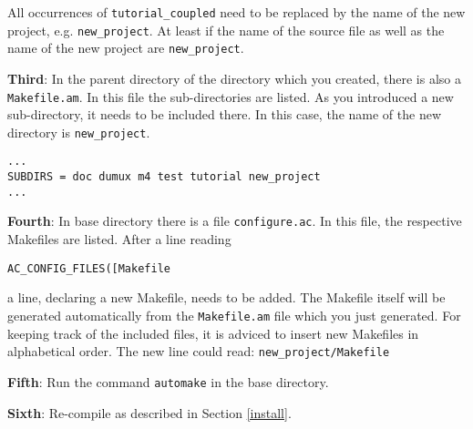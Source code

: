 All occurrences of \texttt{tutorial\_coupled} need to be replaced by
the name of the new project, e.g. \texttt{new\_project}. At least if
the name of the source file as well as the name of the new project are
\texttt{new\_project}.

\textbf{Third}: In the parent directory of the directory which you
created, there is also a \texttt{Makefile.am}. In this file the
sub-directories are listed. As you introduced a new sub-directory, it
needs to be included there. In this case, the name of the new
directory is \texttt{new\_project}.

\begin{verbatim}
...
SUBDIRS = doc dumux m4 test tutorial new_project
...
\end{verbatim}

\textbf{Fourth}: In \eWoms base directory there is a file
\texttt{configure.ac}. In this file, the respective Makefiles are
listed. After a line reading

 \texttt{AC\_CONFIG\_FILES([Makefile} 

 \noindent a line, declaring a new Makefile, needs to be added. The
 Makefile itself will be generated automatically from the
 \texttt{Makefile.am} file which you just generated. For keeping track
 of the included files, it is adviced to insert new Makefiles in
 alphabetical order. The new line could read:
 \texttt{new\_project/Makefile}

 \textbf{Fifth}: Run the command \texttt{automake} in the \eWoms base
 directory.

 \textbf{Sixth}: Re-compile \eWoms as described in Section \ref{install}.





